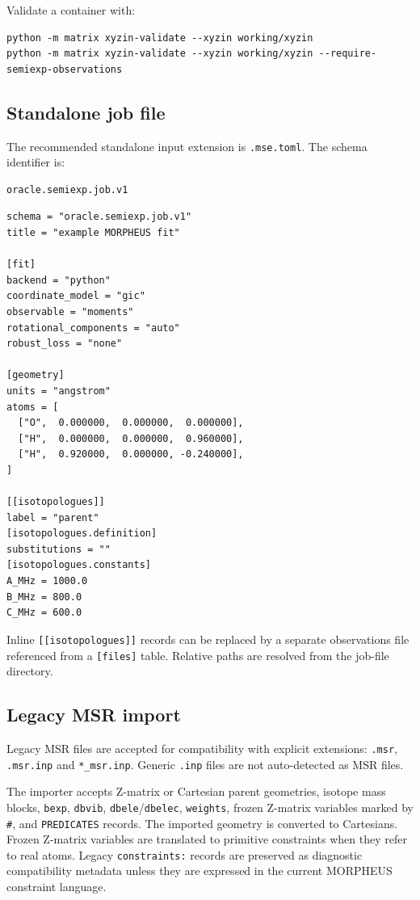 \documentclass[11pt]{article}
\begin{document}
Validate a container with:

\begin{lstlisting}[style=oracle]
python -m matrix xyzin-validate --xyzin working/xyzin
python -m matrix xyzin-validate --xyzin working/xyzin --require-semiexp-observations
\end{lstlisting}

\subsection{Standalone job file}

The recommended standalone input extension is \texttt{.mse.toml}.  The schema
identifier is:
\begin{lstlisting}[style=oracle]
oracle.semiexp.job.v1
\end{lstlisting}

\begin{lstlisting}[style=oracle]
schema = "oracle.semiexp.job.v1"
title = "example MORPHEUS fit"

[fit]
backend = "python"
coordinate_model = "gic"
observable = "moments"
rotational_components = "auto"
robust_loss = "none"

[geometry]
units = "angstrom"
atoms = [
  ["O",  0.000000,  0.000000,  0.000000],
  ["H",  0.000000,  0.000000,  0.960000],
  ["H",  0.920000,  0.000000, -0.240000],
]

[[isotopologues]]
label = "parent"
[isotopologues.definition]
substitutions = ""
[isotopologues.constants]
A_MHz = 1000.0
B_MHz = 800.0
C_MHz = 600.0
\end{lstlisting}

Inline \texttt{[[isotopologues]]} records can be replaced by a separate
observations file referenced from a \texttt{[files]} table.  Relative paths are
resolved from the job-file directory.

\subsection{Legacy MSR import}

Legacy MSR files are accepted for compatibility with explicit extensions:
\texttt{.msr}, \texttt{.msr.inp} and \texttt{*\_msr.inp}.  Generic
\texttt{.inp} files are not auto-detected as MSR files.

The importer accepts Z-matrix or Cartesian parent geometries, isotope mass
blocks, \texttt{bexp}, \texttt{dbvib}, \texttt{dbele}/\texttt{dbelec},
\texttt{weights}, frozen Z-matrix variables marked by \texttt{\#}, and
\texttt{PREDICATES} records.  The imported geometry is converted to Cartesians.
Frozen Z-matrix variables are translated to primitive constraints when they
refer to real atoms.  Legacy \texttt{constraints:} records are preserved as
diagnostic compatibility metadata unless they are expressed in the current MORPHEUS
constraint language.
\end{document}
